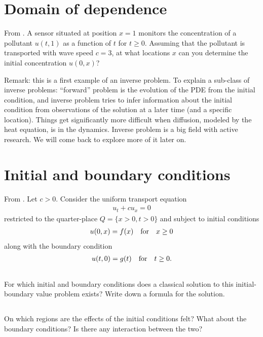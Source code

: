 \documentclass[11pt,letterpaper]{article}
\begin{document}
\section{Domain of dependence}
From \cite[Excercise 2.2.12]{Olver_14}. A sensor situated at position $x=1$ monitors the concentration of a pollutant $u(t,1)$ as a function of $t$ for $t\geq 0$. Assuming that the pollutant is transported with wave speed $c=3$, at what locations $x$ can you determine the initial concentration $u(0,x)$? 

Remark: this is a first example of an inverse problem. To explain a sub-class of inverse problems: ``forward'' problem is the evolution of the PDE from the initial condition, and inverse problem tries to infer information about the initial condition from observations of the solution at a later time (and a specific location). Things get significantly more difficult when diffusion, modeled by the heat equation, is in the dynamics. Inverse problem is a big field with active research. We will come back to explore more of it later on.

\section{Initial and boundary conditions}
From \cite[Excercise 2.2.14]{Olver_14}. Let $c>0$. Consider the uniform transport equation
\begin{align}
    u_t+cu_x = 0
\end{align}
restricted to the quarter-place $Q = \{x>0, t>0\}$ and subject to initial conditions
\begin{align}
    u(0,x) = f(x) \quad \mbox{for} \quad x\geq 0
\end{align}
along with the boundary condition
\begin{align}
    u(t,0) = g(t) \quad \mbox{for} \quad t\geq 0.
\end{align}

\subsection{}
For which initial and boundary conditions does a classical solution to this initial-boundary value problem exists? Write down a formula for the solution.

\subsection{}
On which regions are the effects of the initial conditions felt? What about the boundary conditions? Is there any interaction between the two?
\end{document}
